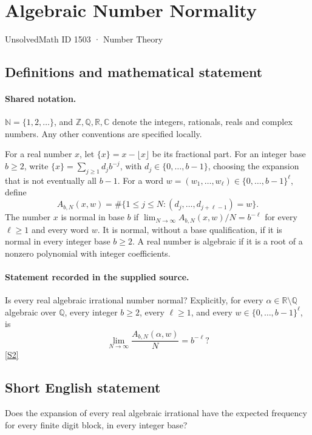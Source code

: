 \documentclass[11pt]{article}
\newcommand{\sref}[2]{\hyperlink{source:#1:#2}{[S#2]}}
\begin{document}
\setcounter{section}{1502}
\section{Algebraic Number Normality}\label{1503}
{\small\sffamily UnsolvedMath ID 1503 · Number Theory}
\subsection{Definitions and mathematical statement}

\paragraph{Shared notation.}$\mathbb N=\{1,2,\ldots\}$, and $\mathbb Z,\mathbb Q,\mathbb R,\mathbb C$ denote the integers, rationals, reals and complex numbers. Any other conventions are specified locally.


For a real number \(x\), let \(\{x\}=x-\lfloor x\rfloor\)
be its fractional part. For an integer base \(b\ge2\), write
\(\{x\}=\sum_{j\ge1}d_jb^{-j}\), with
\(d_j\in\{0,\ldots,b-1\}\), choosing the expansion that is not
eventually all \(b-1\). For a word
\(w=(w_1,\ldots,w_\ell)\in\{0,\ldots,b-1\}^\ell\), define
\[
 A_{b,N}(x,w)=\#\{1\le j\le N:
       (d_j,\ldots,d_{j+\ell-1})=w\}.
\]
The number \(x\) is normal in base \(b\) if
\(\lim_{N\to\infty}A_{b,N}(x,w)/N=b^{-\ell}\) for every
\(\ell\ge1\) and every word \(w\). It is normal, without a base
qualification, if it is normal in every integer base \(b\ge2\).
A real number is algebraic if it is a root of a nonzero polynomial
with integer coefficients.
\paragraph{Statement recorded in the supplied source.}
Is every real algebraic irrational number normal? Explicitly,
for every \(\alpha\in\mathbb R\setminus\mathbb Q\) algebraic over
\(\mathbb Q\), every integer \(b\ge2\), every \(\ell\ge1\), and every
\(w\in\{0,\ldots,b-1\}^\ell\), is
\[
                \lim_{N\to\infty}\frac{A_{b,N}(\alpha,w)}N=b^{-\ell}?
\] \sref{1503}{2}
\subsection{Short English statement}
Does the expansion of every real algebraic irrational have the expected frequency for every finite digit block, in every integer base?
\end{document}
